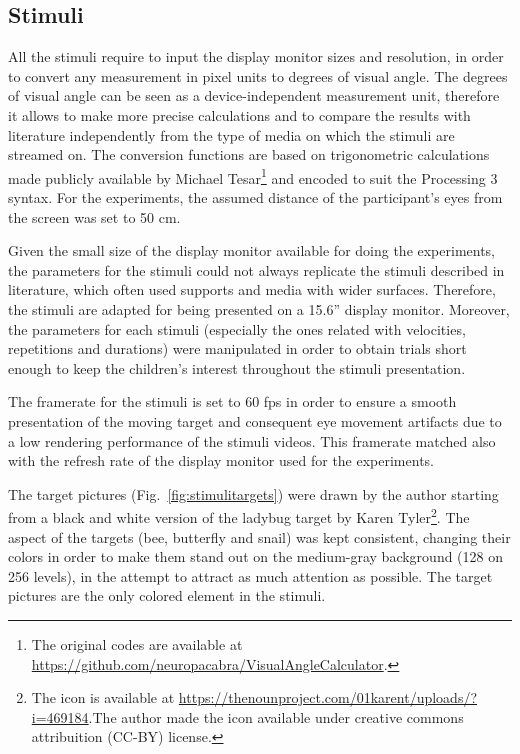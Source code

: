 \subsection{Stimuli}
\label{sec:expstimuli}

All the stimuli require to input the display monitor sizes and resolution, in order to convert any measurement in pixel units to degrees of visual angle. The degrees of visual angle can be seen as a device-independent measurement unit, therefore it allows to make more precise calculations and to compare the results with literature independently from the type of media on which the stimuli are streamed on. The conversion functions are based on trigonometric calculations made publicly available by Michael Tesar\footnote{The original codes are available at \url{https://github.com/neuropacabra/VisualAngleCalculator}.} and encoded to suit the Processing 3 syntax. For the experiments, the assumed distance of the participant’s eyes from the screen was set to 50 cm.

Given the small size of the display monitor available for doing the experiments, the parameters for the stimuli could not always replicate the stimuli described in literature, which often used supports and media with wider surfaces. Therefore, the stimuli are adapted for being presented on a 15.6” display monitor. Moreover, the parameters for each stimuli (especially the ones related with velocities, repetitions and durations) were manipulated in order to obtain trials short enough to keep the children’s interest throughout the stimuli presentation.

The framerate for the stimuli is set to 60 fps in order to ensure a smooth presentation of the moving target and consequent eye movement artifacts due to a low rendering performance of the stimuli videos. This framerate matched also with the refresh rate of the display monitor used for the experiments.

The target pictures (Fig.~\ref{fig:stimulitargets}) were drawn by the author starting from a black and white version of the ladybug target by Karen Tyler\footnote{The icon is available at \url{https://thenounproject.com/01karent/uploads/?i=469184}.The author made the icon available under creative commons attribuition (CC-BY) license.}. The aspect of the targets (bee, butterfly and snail) was kept consistent, changing their colors in order to make them stand out on the medium-gray background (128 on 256 levels), in the attempt to attract as much attention as possible. The target pictures are the only colored element in the stimuli.

